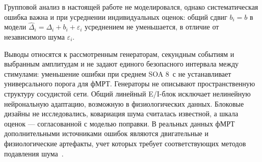 Групповой анализ в настоящей работе не моделировался, однако систематическая ошибка важна и при усреднении индивидуальных оценок: общий сдвиг $b_i=b$ в модели $\hat\Delta_i=\Delta_i+b_i+\varepsilon_i$ усреднением не уменьшается, в отличие от независимого шума $\varepsilon_i$.

Выводы относятся к рассмотренным генераторам, секундным событиям и выбранным амплитудам и не задают единого безопасного интервала между стимулами: уменьшение ошибки при среднем SOA 8~с не устанавливает универсального порога для фМРТ. Генераторы не описывают пространственную структуру сосудистой сети. Общий линейный E/I-блок исключает нелинейную нейрональную адаптацию, возможную в физиологических данных. Блоковые дизайны не исследовались, ковариация шума считалась известной, а шкала оценок --- согласованной с моделью поправки. В реальных данных фМРТ дополнительными источниками ошибок являются двигательные и физиологические артефакты, учет которых требует соответствующих методов подавления шума~\cite{masharipov2026netn}.
